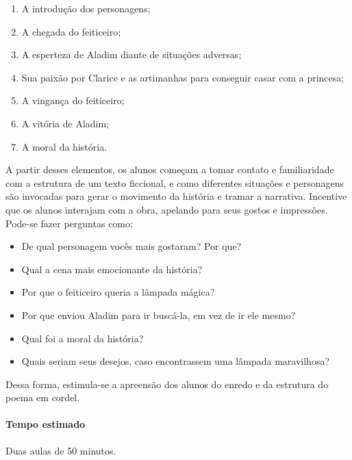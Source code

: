 \documentclass[11pt]{extarticle}
\begin{document}
\begin{enumerate}
\item A introdução dos personagens;

\item A chegada do feiticeiro;

\item A esperteza de Aladim diante de situações adversas;

\item Sua paixão por Clarice e as artimanhas para conseguir casar com a princesa;

\item A vingança do feiticeiro;

\item A vitória de Aladim;

\item A moral da história.
\end{enumerate}

A partir desses elementos, os alunos começam a tomar contato e familiaridade com a estrutura de um texto ficcional, e como diferentes situações e personagens são invocadas para gerar o movimento da história e tramar a narrativa. Incentive que os alunos interajam com a obra, apelando para seus gostos e impressões.
Pode-se fazer perguntas como:

\begin{itemize}
\item De qual personagem vocês mais gostaram? Por que?

\item Qual a cena mais emocionante da história?

\item Por que o feiticeiro queria a lâmpada mágica?

\item Por que enviou Aladim para ir buscá-la, em vez de ir ele mesmo?

\item Qual foi a moral da história?

\item Quais seriam seus desejos, caso encontrassem uma lâmpada maravilhosa?
\end{itemize}

Dessa forma, estimula-se a apreensão dos alunos do enredo e da estrutura do poema em cordel.

\paragraph{Tempo estimado} Duas aulas de 50 minutos.
\end{document}
